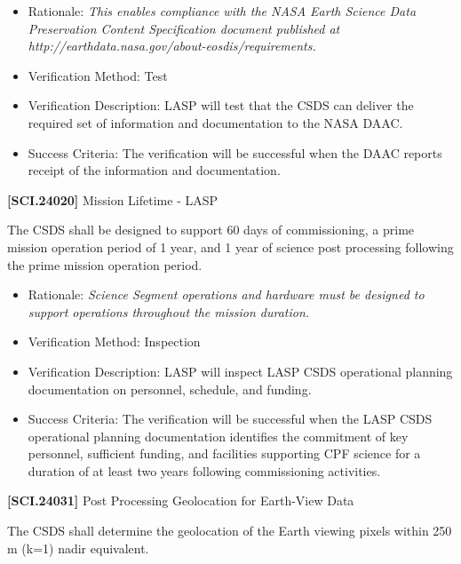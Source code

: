 \begin{itemize}
\item{} Rationale: \emph{This enables compliance with the NASA Earth Science Data Preservation Content Specification document published at http:\slash \slash earthdata.nasa.gov\slash about-eosdis\slash requirements.}

\item{} Verification Method: Test

\item{} Verification Description: \gls{LASP} will \gls{test} that the \gls{CSDS} can deliver the required set of information and documentation to the NASA \gls{DAAC}.

\item{} Success Criteria: The verification will be successful when the \gls{DAAC} reports receipt of the information and documentation.

\end{itemize}

\textbf{[SCI.24020]} Mission Lifetime - \gls{LASP}

The \gls{CSDS} shall be designed to support 60 days of commissioning, a prime mission operation period of 1 year, and 1 year of science post processing following the prime mission operation period.

\begin{itemize}
\item{} Rationale: \emph{Science Segment operations and hardware must be designed to support operations throughout the mission duration.}

\item{} Verification Method: Inspection

\item{} Verification Description: \gls{LASP} will inspect \gls{LASP} \gls{CSDS} operational planning documentation on personnel, schedule, and funding.

\item{} Success Criteria: The verification will be successful when the \gls{LASP} \gls{CSDS} operational planning documentation identifies the commitment of key personnel, sufficient funding, and facilities supporting \gls{CPF} science for a duration of at least two years following commissioning activities.

\end{itemize}

\textbf{[SCI.24031]} Post Processing Geolocation for Earth-View Data

The \gls{CSDS} shall determine the geolocation of the Earth viewing pixels within 250 m (k=1) nadir equivalent.

